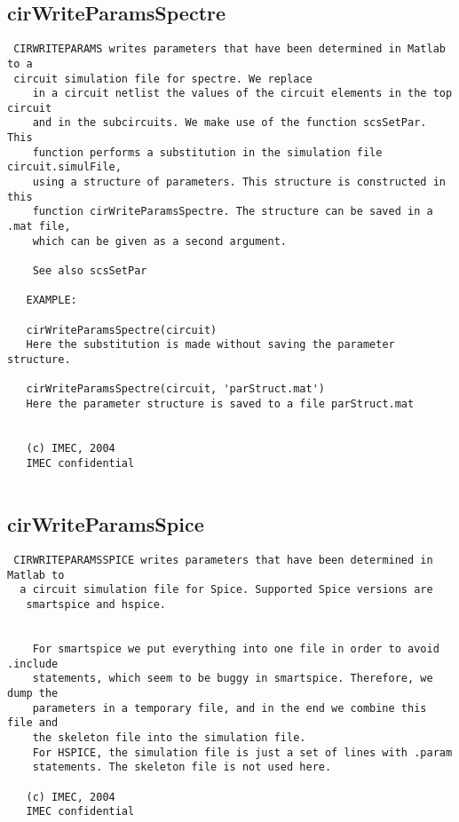 \newpage
\subsection{cirWriteParamsSpectre}
\label{sec:cirWriteParamsSpectre}
\begin{verbatim}
 CIRWRITEPARAMS writes parameters that have been determined in Matlab to a
 circuit simulation file for spectre. We replace
    in a circuit netlist the values of the circuit elements in the top circuit
    and in the subcircuits. We make use of the function scsSetPar. This
    function performs a substitution in the simulation file circuit.simulFile,
    using a structure of parameters. This structure is constructed in this
    function cirWriteParamsSpectre. The structure can be saved in a .mat file,
    which can be given as a second argument.
 
    See also scsSetPar
 
   EXAMPLE:
  
   cirWriteParamsSpectre(circuit)
   Here the substitution is made without saving the parameter structure.
 
   cirWriteParamsSpectre(circuit, 'parStruct.mat')
   Here the parameter structure is saved to a file parStruct.mat
 
 
   (c) IMEC, 2004
   IMEC confidential 
 

\end{verbatim}

\newpage
\subsection{cirWriteParamsSpice}
\label{sec:cirWriteParamsSpice}
\begin{verbatim}
 CIRWRITEPARAMSSPICE writes parameters that have been determined in Matlab to 
  a circuit simulation file for Spice. Supported Spice versions are  
   smartspice and hspice. 
 
 
    For smartspice we put everything into one file in order to avoid .include
    statements, which seem to be buggy in smartspice. Therefore, we dump the
    parameters in a temporary file, and in the end we combine this file and
    the skeleton file into the simulation file.
    For HSPICE, the simulation file is just a set of lines with .param
    statements. The skeleton file is not used here.
 
   (c) IMEC, 2004
   IMEC confidential 
 

\end{verbatim}

\newpage
\newpage
